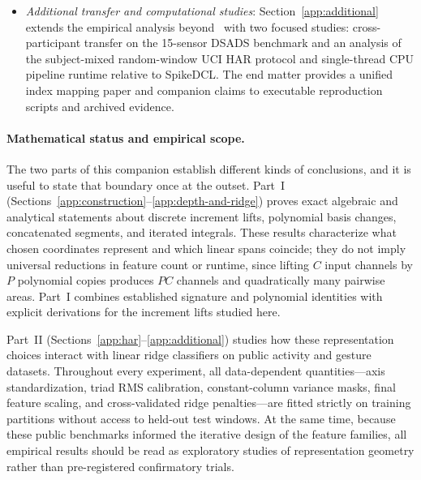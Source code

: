 \documentclass[10pt,a4paper]{article}
\numberwithin{equation}{section}
\theoremstyle{plain}
\theoremstyle{definition}
\begin{document}
\begin{itemize}
as a nested filtration across full and local channel-interaction graphs, and
reports cross-validation behavior, selected penalties, and paired sequence
comparisons.
\item \emph{Additional transfer and computational studies}:
Section~\ref{app:additional} extends the empirical analysis beyond~\cite{mainpaper}
with two focused studies: cross-participant transfer on the 15-sensor DSADS
benchmark and an analysis of the subject-mixed random-window UCI HAR protocol
and single-thread CPU pipeline runtime relative to SpikeDCL. The end matter
provides a unified index mapping paper and companion claims to executable
reproduction scripts and archived evidence.
\end{itemize}

\paragraph{Mathematical status and empirical scope.}
The two parts of this companion establish different kinds of conclusions, and
it is useful to state that boundary once at the outset. Part~I
(Sections~\ref{app:construction}--\ref{app:depth-and-ridge}) proves exact
algebraic and analytical statements about discrete increment lifts, polynomial
basis changes, concatenated segments, and iterated integrals. These results
characterize what chosen coordinates represent and which linear spans coincide;
they do not imply universal reductions in feature count or runtime, since
lifting \(C\) input channels by \(P\) polynomial copies produces \(PC\) channels
and quadratically many pairwise areas.
Part~I combines established signature and polynomial identities with explicit
derivations for the increment lifts studied here.

Part~II (Sections~\ref{app:har}--\ref{app:additional}) studies how these
representation choices interact with linear ridge classifiers on public
activity and gesture datasets. Throughout every experiment, all data-dependent
quantities---axis standardization, triad RMS calibration, constant-column
variance masks, final feature scaling, and cross-validated ridge penalties---are
fitted strictly on training partitions without access to held-out test windows.
At the same time, because these public benchmarks informed the iterative design
of the feature families, all empirical results should be read as exploratory
studies of representation geometry rather than pre-registered confirmatory
trials.
\end{document}
